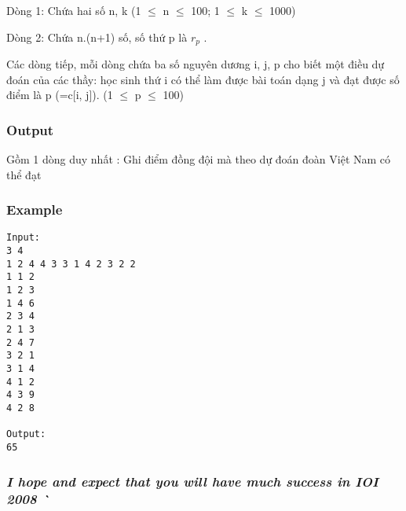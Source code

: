 Dòng 1: Chứa hai số n, k (1  $\le$  n  $\le$  100; 1  $\le$  k  $\le$  1000)

Dòng 2: Chứa n.(n+1) số, số thứ p là $r_{p}$ .

Các dòng tiếp, mỗi dòng chứa ba số nguyên dương i, j, p cho biết một điều dự đoán của các thầy: học sinh thứ i có thể làm được bài toán dạng j và đạt được số điểm là p (=c[i, j]). (1  $\le$  p  $\le$  100)

\subsubsection{Output}

Gồm 1 dòng duy nhất : Ghi điểm đồng đội mà theo dự đoán đoàn Việt Nam có thể đạt

\subsubsection{Example}
\begin{verbatim}
Input:
3 4
1 2 4 4 3 3 1 4 2 3 2 2
1 1 2
1 2 3
1 4 6
2 3 4
2 1 3
2 4 7
3 2 1
3 1 4
4 1 2
4 3 9
4 2 8

Output:
65
\end{verbatim}

\subsubsection{\emph{I hope and expect that you will have much success in IOI 2008 ^^ }}
